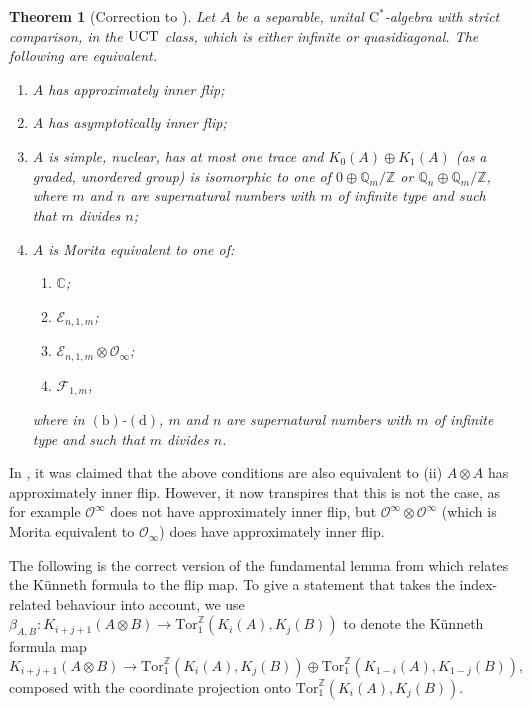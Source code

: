 \documentclass[a4paper,10pt]{amsart}
\newcommand{\T}[1]{\textup{#1}}
\newcommand{\cstar}{\ensuremath{\mathrm C^\ast}}
\newcounter{theorem}
\newtheorem{thm}[theorem]{Theorem}
\numberwithin{equation}{section}
\numberwithin{theorem}{section}
\newcommand{\Q}{\mathbb{Q}}
\newcommand{\Z}{\mathbb{Z}}
\newcommand{\Tor}{\mathrm{Tor}_1^{\Z}}
\begin{document}
\begin{thm}[{Correction to \cite[Theorem 2.2]{aifK}}]
\label{thm:MainThmCorrected}
Let $A$ be a separable, unital $\cstar$-algebra with strict comparison, in the $\T{UCT}$ class, which is either infinite or quasidiagonal.
The following are equivalent.
\begin{enumerate}
\item $A$ has approximately inner flip; 
\item $A$ has asymptotically inner flip;
\item $A$ is simple, nuclear, has at most one trace and $K_0(A)\oplus K_1(A)$ (as a graded, unordered group) is isomorphic to one of $0\oplus \Q_m/\Z$ or $\Q_n \oplus \Q_m/\Z$, where $m$ and $n$ are supernatural numbers with $m$ of infinite type and such that $m$ divides $n$;
\item $A$ is Morita equivalent to one of:
\begin{enumerate}
\item $\mathbb C$;
\item $\mathcal E_{n,1,m}$;
\item $\mathcal E_{n,1,m} \otimes \mathcal O_\infty$;
\item $\mathcal F_{1,m}$,
\end{enumerate}
where in $\mathrm{(b)}$-$\mathrm{(d)}$, $m$ and $n$ are supernatural numbers with $m$ of infinite type and such that $m$ divides $n$.
\end{enumerate}
\end{thm}

In \cite[Theorem 2.2]{aifK}, it was claimed that the above conditions are also equivalent to (ii) $A \otimes A$ has approximately inner flip.
However, it now transpires that this is not the case, as for example $\mathcal O^\infty$ does not have approximately inner flip, but $\mathcal O^\infty \otimes \mathcal O^\infty$ (which is Morita equivalent to $\mathcal O_\infty$) does have approximately inner flip.

The following is the correct version of the fundamental lemma from \cite{aifK} which relates the K\"unneth formula to the flip map.
To give a statement that takes the index-related behaviour into account, we use $\beta_{A,B}\colon K_{i+j+1}(A\otimes B) \to \Tor(K_i(A),K_j(B))$ to denote the K\"unneth formula map
\[ K_{i+j+1}(A\otimes B) \to \Tor(K_i(A),K_j(B))\oplus \Tor(K_{1-i}(A),K_{1-j}(B)), \]
composed with the coordinate projection onto $\Tor(K_i(A),K_j(B))$.
\end{document}

